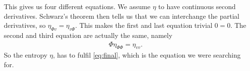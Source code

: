 This gives us four different equations. We assume $\eta$ to have continuous second derivatives.  Schwarz's theorem then tells us that we can interchange the partial derivatives, so $\eta_{\Phi v} = \eta_{v\Phi}$. This makes the first and last equation trivial $0 = 0$. The second and third equation are actually the same, namely 
\begin{align}
\Phi \eta_{\Phi\Phi} = \eta_{vv}.\label{eq:final}
\end{align}
So the entropy $\eta$, has to fulfil \cref{eq:final}, which is the equation we were searching for. 